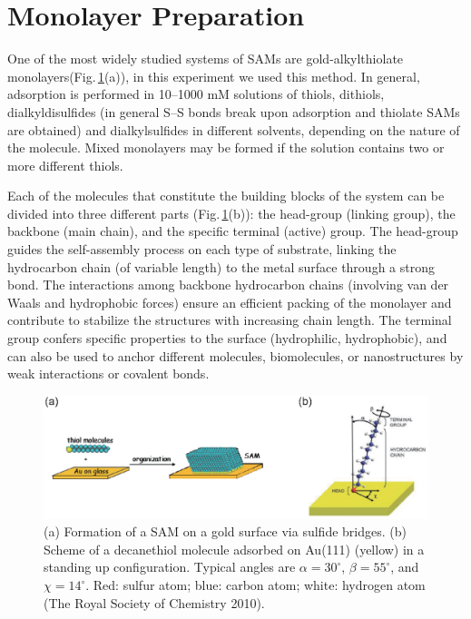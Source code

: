 \section{Monolayer Preparation}

One of the most widely studied systems of SAMs are gold-alkylthiolate monolayers(Fig.\,\ref{sam1}(a)), in this experiment we used this method.
In general, adsorption is performed in 10–1000 mM solutions of thiols, dithiols,
dialkyldisulfides (in general S–S bonds break upon adsorption and thiolate SAMs are obtained) and dialkylsulfides in different solvents, depending on the nature of the molecule. Mixed monolayers may be formed if the solution contains two or more different thiols.

Each of the molecules that constitute the building blocks of the system can be
divided into three different parts (Fig.\,\ref{sam1}(b)):
the head-group (linking group), the backbone (main chain), and the specific terminal (active) group. The head-group guides the self-assembly process on each type of substrate, linking the hydrocarbon chain (of variable length) to the metal surface through a strong bond.
The interactions among backbone hydrocarbon chains (involving van der Waals and hydrophobic forces) ensure an efficient packing of the monolayer and contribute to stabilize the structures with increasing chain length.
The terminal group confers specific properties to the surface (hydrophilic, hydrophobic), and can also be used to anchor different molecules, biomolecules, or nanostructures by weak interactions or covalent bonds.


\begin{figure}[h]
\centering
\includegraphics[width=0.9\columnwidth]{sam.eps}
\caption{(a) Formation of a SAM on a gold surface via sulfide bridges. (b) Scheme of a decanethiol molecule adsorbed on Au(111) (yellow) in a standing up configuration. Typical angles are $\alpha=30^\circ$, $\beta=55^\circ$, and $\chi=14^\circ$. Red: sulfur atom; blue: carbon atom; white: hydrogen atom (The Royal Society of Chemistry 2010).}
\label{sam1}
\end{figure}


